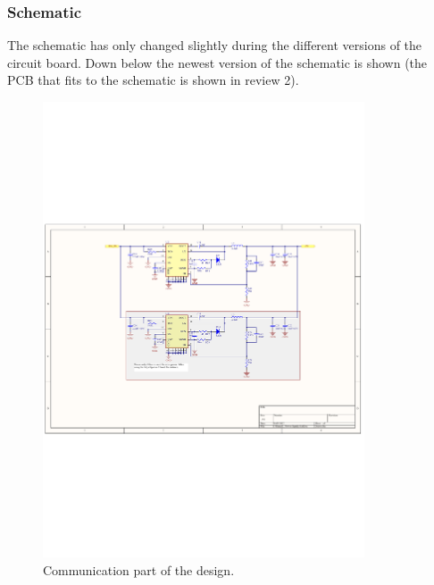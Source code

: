 \subsubsection{Schematic}
The schematic has only changed slightly during the different versions of the circuit board. Down below the newest version of the schematic is shown (the PCB that fits to the schematic is shown in review 2).
\begin{figure}[H]
	\begin{centering}
		 \includegraphics[width=0.85\textwidth,page=2,angle=0]{images/SIG60_v0_4}
		\caption{Communication part of the design.}
	\end{centering}
\end{figure}

